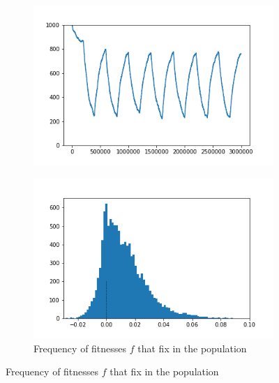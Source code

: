 \documentclass{article}
\begin{document}
\begin{figure}[h]
	\centering
	\begin{subfigure}[t]{0.305\linewidth}
		\centering
		\includegraphics[width = 1.0\linewidth, trim={5 5 40 30}, clip=true]{figures/changing_resample_selection_trajec.png}
		\label{fig:changing_resample_trajec}	
	\end{subfigure}
	\hspace{0.03\linewidth}
	\begin{subfigure}[t]{0.305\linewidth}
		\centering
		\includegraphics[width = 1.0\linewidth, trim={5 5 40 30}, clip=true]{figures/changing_resample_selection_hist2.png}
		\caption{Frequency of fitnesses $f$ that fix in the population}
		\label{fig:changing_resample_hist}
	\end{subfigure}
	\hspace{0.03\linewidth}

\end{figure}
\end{document}
